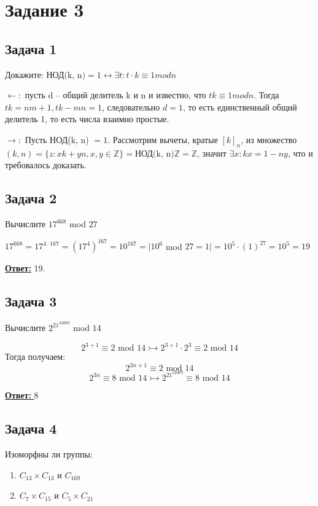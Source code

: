\documentclass[a4paper,14pt]{article} %
\begin{document}

\section{Задание 3}
\subsection{Задача 1}
Докажите: $\text{НОД(k, n)} = 1 \leftrightarrow \exists t : t \cdot k \equiv 1 mod n$

$\leftarrow :$ пусть d --  общий делитель k и n и известно, что $tk \equiv 1 mod n$. Тогда $tk = nm +1, tk - mn = 1$, следовательно $d = 1$, то есть единственный общий делитель 1, то есть числа взаимно простые.

$\rightarrow :$ Пусть НОД(k, n) $ = 1$. Рассмотрим вычеты, кратые $[k]_n$, из множество $(k, n) = \{z : xk + yn, x, y \in \mathds{Z} \} = \text{НОД(k, n)} \mathds{Z} = \mathds{Z}$, значит $\exists x : kx = 1 - ny$, что и требовалось доказать.

\subsection{Задача 2}
Вычислите $17^{668}$ mod $27$

$17^{668} = 17^{4 \cdot 167} = (17^{4})^{167} = 10^{167} = | 10^6$ mod $27 = 1 | = 10^5 \cdot (1)^27 = 10^5 = 19$ 

\underline{\textbf{Ответ:}} 19.

\subsection{Задача 3}
Вычислите $2^{21^{42069}}$ mod $14$

\begin{equation*}
	2^{3+1} \equiv 2 \text{ mod } 14 \rightarrowtail 2^{3+1}\cdot 2^3 \equiv 2 \text{ mod } 14
\end{equation*}
Тогда получаем:
\begin{equation*}
	2^{3n+1} \equiv 2 \text{ mod } 14 
\end{equation*}
\begin{equation*}
	2^{3n} \equiv 8 \text{ mod } 14 \rightarrowtail 2^{21^{42069}} \equiv 8 \text{ mod } 14
\end{equation*}

\underline{\textbf{Ответ: }} 8

\subsection{Задача 4}
Изоморфны ли группы:
\begin{enumerate}
	\item $C_{13} \times C_{13}$ и $C_{169}$
	\item $C_7 \times C_{15}$ и $C_5 \times C_{21}$
\end{enumerate}
\end{document}
